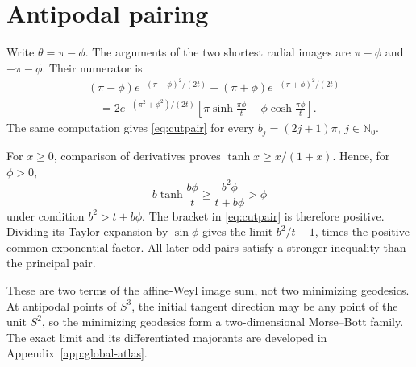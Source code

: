 \section{Antipodal pairing}\label{app:cut}

Write $\theta=\pi-\phi$.  The arguments of the two shortest radial images are
$\pi-\phi$ and $-\pi-\phi$.  Their numerator is
\begin{align*}
&(\pi-\phi)e^{-(\pi-\phi)^2/(2t)}
-(\pi+\phi)e^{-(\pi+\phi)^2/(2t)}\\
&\quad=2e^{-(\pi^2+\phi^2)/(2t)}
\left[\pi\sinh\frac{\pi\phi}{t}
-\phi\cosh\frac{\pi\phi}{t}\right].
\end{align*}
The same computation gives \eqref{eq:cutpair} for every
$b_j=(2j+1)\pi$, $j\in\mathbb N_0$.

For $x\ge0$, comparison of derivatives proves
$\tanh x\ge x/(1+x)$.  Hence, for $\phi>0$,
\[
b\tanh\frac{b\phi}{t}
\ge\frac{b^2\phi}{t+b\phi}>\phi
\]
under condition $b^2>t+b\phi$.  The bracket in
\eqref{eq:cutpair} is therefore positive.  Dividing its Taylor expansion by
$\sin\phi$ gives the limit $b^2/t-1$, times the positive common exponential
factor.  All later odd pairs satisfy a stronger inequality than the principal
pair.

These are two terms of the affine-Weyl image sum, not two minimizing
geodesics.  At antipodal points of $S^3$, the initial tangent direction may
be any point of the unit $S^2$, so the minimizing geodesics form a
two-dimensional Morse--Bott family.  The exact limit and its differentiated
majorants are developed in Appendix~\ref{app:global-atlas}.

